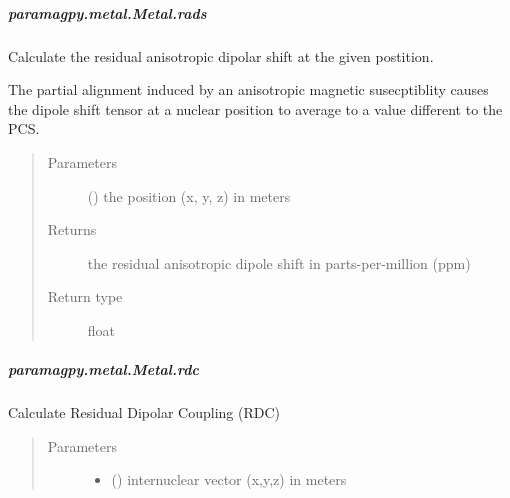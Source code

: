 \documentclass[a4paper,10pt,english,openany,oneside]{sphinxmanual}
\begin{document}
\begin{fulllineitems}
\begin{fulllineitems}
\subparagraph{paramagpy.metal.Metal.rads}
\label{\detokenize{reference/generated/paramagpy.metal.Metal.rads:paramagpy-metal-metal-rads}}\label{\detokenize{reference/generated/paramagpy.metal.Metal.rads::doc}}

\begin{fulllineitems}
\label{\detokenize{reference/generated/paramagpy.metal.Metal.rads:paramagpy.metal.Metal.rads}}
Calculate the residual anisotropic dipolar shift at the
given postition.

The partial alignment induced by an anisotropic
magnetic susecptiblity causes the dipole shift tensor at a nuclear
position to average to a value different to the PCS.
\begin{quote}\begin{description}
\item[{Parameters}] \leavevmode
{} () \textendash{} the position (x, y, z) in meters

\item[{Returns}] \leavevmode
{} \textendash{} the residual anisotropic dipole shift in parts-per-million (ppm)

\item[{Return type}] \leavevmode
float

\end{description}\end{quote}

\end{fulllineitems}



\subparagraph{paramagpy.metal.Metal.rdc}
\label{\detokenize{reference/generated/paramagpy.metal.Metal.rdc:paramagpy-metal-metal-rdc}}\label{\detokenize{reference/generated/paramagpy.metal.Metal.rdc::doc}}

\begin{fulllineitems}
\label{\detokenize{reference/generated/paramagpy.metal.Metal.rdc:paramagpy.metal.Metal.rdc}}
Calculate Residual Dipolar Coupling (RDC)
\begin{quote}\begin{description}
\item[{Parameters}] \leavevmode\begin{itemize}
\item {} 
 () \textendash{} internuclear vector (x,y,z) in meters


\end{itemize}
\end{description}
\end{quote}
\end{fulllineitems}
\end{fulllineitems}
\end{fulllineitems}
\end{document}
